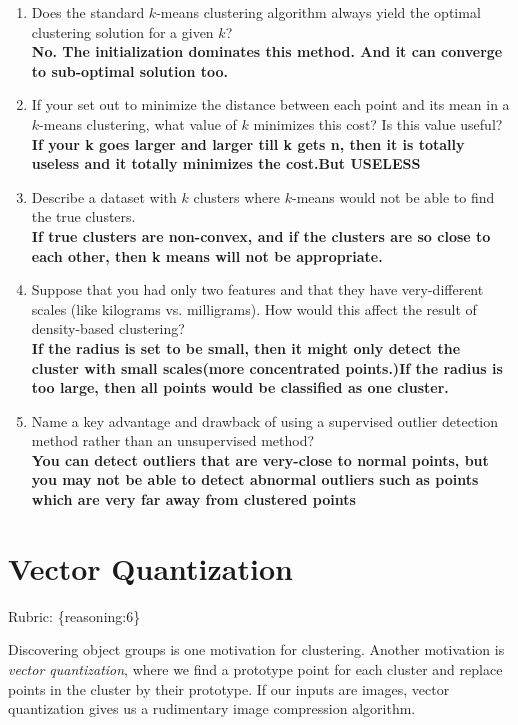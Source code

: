 \documentclass{article}
\def\blu#1{{\color{blu}#1}}
\def\gre#1{{\color{gre}#1}}
\def\enum#1{\begin{enumerate}#1\end{enumerate}}
\def\rubric#1{\gre{Rubric: \{#1\}}}{}
\begin{document}
\blu{
\enum{
\item Does the standard $k$-means clustering algorithm always yield the optimal clustering solution for a given $k$?\\\textbf{No. The initialization dominates this method. And it can converge to sub-optimal solution too.}\\
\item If your set out to minimize the distance between each point and its mean in a $k$-means clustering, what value of $k$ minimizes this cost? Is this value useful?\\
\textbf{If your k goes larger and larger till k gets n, then it is totally useless and it totally minimizes the cost.But USELESS}\\
\item Describe a dataset with $k$ clusters where $k$-means would not be able to find the true clusters.\\
\textbf{If  true clusters are non-convex, and if the clusters are so close to each other, then k means will not be appropriate.}\\
\item Suppose that you had only two features and that they have very-different scales (like kilograms vs. milligrams). How would this affect the result of density-based clustering?\\
\textbf{If the radius is set to be small, then it might only detect the cluster with small scales(more concentrated points.)If the radius is too large, then all points would be  classified as one cluster.}
\item Name a key advantage and drawback of using a supervised outlier detection method rather than an unsupervised method?\\
\textbf{You can detect outliers that are very-close to normal points, but you may not be able to detect abnormal outliers such as points which are very far away from clustered points}
}}



\section{Vector Quantization}
\rubric{reasoning:6}

Discovering object groups is one motivation for clustering. Another motivation is \emph{vector quantization}, where we find a prototype point for each cluster and replace points in the cluster by their prototype. If our inputs are images, vector quantization gives us a rudimentary image compression algorithm.
\end{document}
